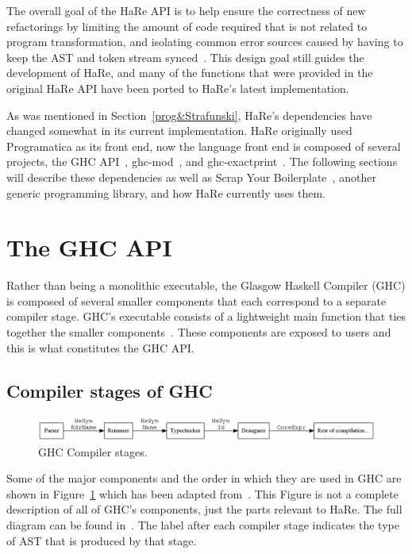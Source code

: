 The overall goal of the HaRe API is to help ensure the correctness of new refactorings by limiting the amount of code required that is not related to program transformation, and isolating common error sources caused by having to keep the AST and token stream synced~\citep{hareApi}. This design goal still guides the development of HaRe, and many of the functions that were provided in the original HaRe API have been ported to HaRe's latest implementation.  

As was mentioned in Section~\ref{prog&Strafunski}, HaRe's dependencies have changed somewhat in its current implementation. HaRe originally used Programatica as its front end, now the language front end is composed of several projects, the GHC API~\citep{ghcApi}, ghc-mod~\citep{ghcMod}, and ghc-exactprint~\citep{exactprint}. The following sections will describe these dependencies as well as Scrap Your Boilerplate~\citep{syb}, another generic programming library, and how HaRe currently uses them.

\section{The GHC API}
\label{ghcApi}

Rather than being a monolithic executable, the Glasgow Haskell Compiler (GHC) is composed of several smaller components that each correspond to a separate compiler stage. GHC's executable consists of a lightweight main function that ties together the smaller components~\citep{ghcDesign}. These components are exposed to users  and this is what constitutes the GHC API.

\subsection{Compiler stages of GHC}\label{ghcStages}

\begin{figure}[t]
	\begin{center}
		\includegraphics[scale=.4]{graphVis/Chapter2/compilerStgs.png}
	\end{center}
	\caption{GHC Compiler stages.}
	\label{compilerStages}
\end{figure}

Some of the major components and the order in which they are used in GHC are shown in Figure~\ref{compilerStages} which has been adapted from~\cite{ghcDesign}. This Figure is not a complete description of all of GHC's components, just the parts relevant to HaRe. The full diagram can be found in~\citep{ghcDesign}. The label after each compiler stage indicates the type of AST that is produced by that stage.

